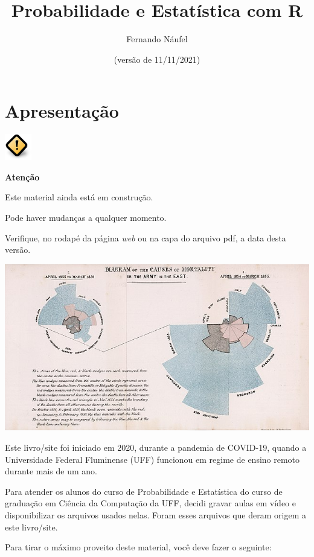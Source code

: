 \documentclass[
  11pt]{report}
\title{Probabilidade e Estatística com R}
\author{Fernando Náufel}
\date{(versão de 11/11/2021)}
\newenvironment{rmdcaution}
{
  \begin{mycaution}
    \includegraphics{images/caution.png}
    \tcblower
  }
  {
  \end{mycaution}
}
\begin{document}
\maketitle

{
\setcounter{tocdepth}{1}
\tableofcontents
}
\hypertarget{apresentacao}{%
\chapter*{Apresentação}\label{apresentacao}}

\begin{rmdcaution}
\textbf{Atenção}

Este material ainda está em construção.

Pode haver mudanças a qualquer momento.

Verifique, no rodapé da página \emph{web} ou na capa do arquivo pdf, a data desta versão.

\end{rmdcaution}

\includegraphics{images/640px-Nightingale-mortality.jpg}

Este livro/site foi iniciado em 2020, durante a pandemia de COVID-19, quando a Universidade Federal Fluminense (UFF) funcionou em regime de ensino remoto durante mais de um ano.

Para atender os alunos do curso de Probabilidade e Estatística do curso de graduação em Ciência da Computação da UFF, decidi gravar aulas em vídeo e disponibilizar os arquivos usados nelas. Foram esses arquivos que deram origem a este livro/site.

Para tirar o máximo proveito deste material, você deve fazer o seguinte:
\end{document}
